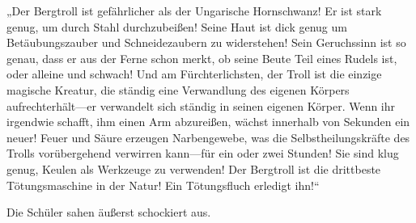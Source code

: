 „Der Bergtroll ist gefährlicher als der Ungarische Hornschwanz! Er ist stark genug, um durch Stahl durchzubeißen! Seine Haut ist dick genug um Betäubungszauber und Schneidezaubern zu widerstehen! Sein Geruchssinn ist so genau, dass er aus der Ferne schon merkt, ob seine Beute Teil eines Rudels ist, oder alleine und schwach! Und am Fürchterlichsten, der Troll ist die einzige magische Kreatur, die ständig eine Verwandlung des eigenen Körpers aufrechterhält—er verwandelt sich ständig in seinen eigenen Körper. Wenn ihr irgendwie schafft, ihm einen Arm abzureißen, wächst innerhalb von Sekunden ein neuer! Feuer und Säure erzeugen Narbengewebe, was die Selbstheilungskräfte des Trolls vorübergehend verwirren kann—für ein oder zwei Stunden! Sie sind klug genug, Keulen als Werkzeuge zu verwenden! Der Bergtroll ist die drittbeste Tötungsmaschine in der Natur! Ein Tötungsfluch erledigt ihn!“

Die Schüler sahen äußerst schockiert aus.

